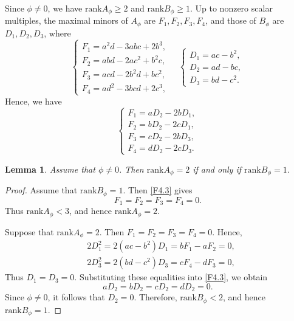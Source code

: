 \documentclass[12pt,reqno]{article}
\newtheorem{lem}[thm]{Lemma}
\def\r{\mathrm}
\def\beqn{\begin{equation*}}
\def\eeqn{\end{equation*}}
\def\beq{\begin{equation}}
\def\eeq{\end{equation}}
\begin{document}
Since $\phi\neq0$, we have $\r{rank}A_\phi\geq2$ and $\r{rank}B_\phi\geq1$. Up to nonzero scalar multiples, the maximal minors of $A_\phi$ are $F_1,F_2,F_3,F_4$, and those of $B_\phi$ are $D_1,D_2,D_3$, where
\beqn
\left\{\begin{array}{l}
	F_1=a^2d-3abc+2b^3,\\
	F_2=abd-2ac^2+b^2c,\\
	F_3=acd-2b^2d+bc^2,\\
	F_4=ad^2-3bcd+2c^3,
\end{array}
\right.\quad
\left\{\begin{array}{l}
	D_1=ac-b^2,\\
	D_2=ad-bc,\\
	D_3=bd-c^2.
\end{array}
\right.
\eeqn
Hence, we have
\beq\label{F4.3}
\left\{\begin{array}{l}
	F_1=aD_2-2bD_1,\\
F_2=bD_2-2cD_1,\\
F_3=cD_2-2bD_3,\\
F_4=dD_2-2cD_3.
\end{array}
\right.
\eeq


\begin{lem}
Assume that $\phi\neq 0$. Then $\r{rank}A_\phi=2$ if and only if $\r{rank}B_\phi=1$.
\end{lem}

\begin{proof}
	Assume that $\r{rank}B_\phi=1$. Then \eqref{F4.3} gives 
	\beqn
	F_1=F_2=F_3=F_4=0.
	\eeqn
Thus $\r{rank}A_\phi<3$, and hence $\r{rank}A_\phi=2$.
	
	Suppose that $\r{rank}A_\phi=2$. Then $F_1=F_2=F_3=F_4=0.$
	Hence,
\begin{align*}
&2D_1^2=2(ac-b^2)D_1=bF_1-aF_2=0,\\
&2D_3^2=2(bd-c^2)D_3=cF_4-dF_3=0,
\end{align*}
Thus $D_1=D_3=0$. Substituting these equalities into \eqref{F4.3}, we obtain
\beqn
aD_2 = bD_2 = cD_2 = dD_2 = 0.
\eeqn
Since $\phi\neq0$, it follows that $D_2=0$. Therefore, $\r{rank}B_\phi<2$, and hence $\r{rank}B_\phi=1$.
\end{proof}
\end{document}
